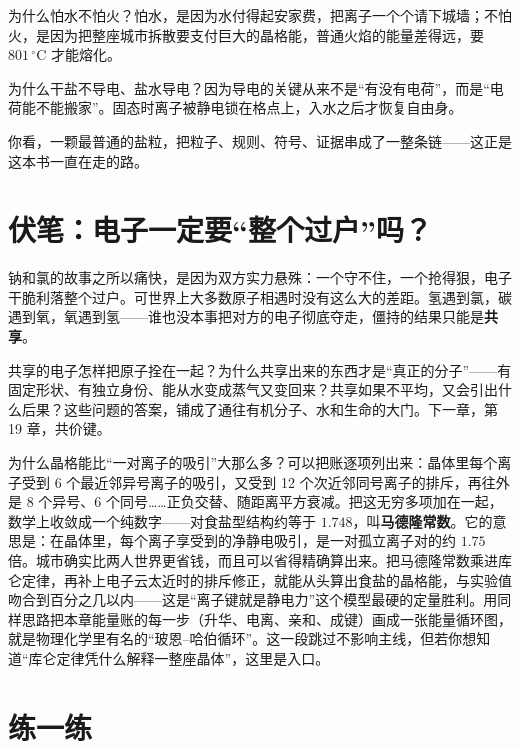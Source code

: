 为什么怕水不怕火？怕水，是因为水付得起安家费，把离子一个个请下城墙；不怕火，是因为把整座城市拆散要支付巨大的晶格能，普通火焰的能量差得远，要 $801\,^{\circ}\mathrm{C}$ 才能熔化。

为什么干盐不导电、盐水导电？因为导电的关键从来不是“有没有电荷”，而是“电荷能不能搬家”。固态时离子被静电锁在格点上，入水之后才恢复自由身。

你看，一颗最普通的盐粒，把粒子、规则、符号、证据串成了一整条链——这正是这本书一直在走的路。

\section{伏笔：电子一定要“整个过户”吗？}

钠和氯的故事之所以痛快，是因为双方实力悬殊：一个守不住，一个抢得狠，电子干脆利落整个过户。可世界上大多数原子相遇时没有这么大的差距。氢遇到氯，碳遇到氧，氧遇到氢——谁也没本事把对方的电子彻底夺走，僵持的结果只能是\textbf{共享}。

共享的电子怎样把原子拴在一起？为什么共享出来的东西才是“真正的分子”——有固定形状、有独立身份、能从水变成蒸气又变回来？共享如果不平均，又会引出什么后果？这些问题的答案，铺成了通往有机分子、水和生命的大门。下一章，第 19 章，共价键。

\begin{tiaozhan}
为什么晶格能比“一对离子的吸引”大那么多？可以把账逐项列出来：晶体里每个离子受到 6 个最近邻异号离子的吸引，又受到 12 个次近邻同号离子的排斥，再往外是 8 个异号、6 个同号……正负交替、随距离平方衰减。把这无穷多项加在一起，数学上收敛成一个纯数字——对食盐型结构约等于 $1.748$，叫\textbf{马德隆常数}。它的意思是：在晶体里，每个离子享受到的净静电吸引，是一对孤立离子对的约 $1.75$ 倍。城市确实比两人世界更省钱，而且可以省得精确算出来。把马德隆常数乘进库仑定律，再补上电子云太近时的排斥修正，就能从头算出食盐的晶格能，与实验值  吻合到百分之几以内——这是“离子键就是静电力”这个模型最硬的定量胜利。用同样思路把本章能量账的每一步（升华、电离、亲和、成键）画成一张能量循环图，就是物理化学里有名的“玻恩–哈伯循环”。这一段跳过不影响主线，但若你想知道“库仑定律凭什么解释一整座晶体”，这里是入口。
\end{tiaozhan}

\section*{练一练}

